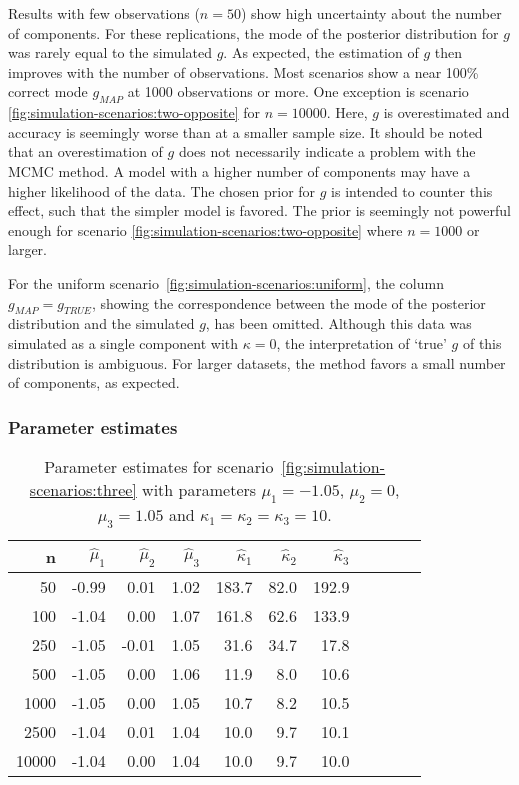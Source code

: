 Results with few observations ($n = 50$) show high uncertainty about the number of components. For these replications, the mode of the posterior distribution for $g$ was rarely equal to the simulated $g$. As expected, the estimation of $g$ then improves with the number of observations. Most scenarios show a near 100\% correct mode $g_{MAP}$ at 1000 observations or more. One exception is scenario \ref{fig:simulation-scenarios:two-opposite} for $n=10000$. Here, $g$ is overestimated and accuracy is seemingly worse than at a smaller sample size. It should be noted that an overestimation of $g$ does not necessarily indicate a problem with the MCMC method. A model with a higher number of components may have a higher likelihood of the data. The chosen prior for $g$ is intended to counter this effect, such that the simpler model is favored. The prior is seemingly not powerful enough for scenario \ref{fig:simulation-scenarios:two-opposite} where $n=1000$ or larger.


For the uniform scenario~\ref{fig:simulation-scenarios:uniform}, the column $g_{MAP} = g_{TRUE}$, showing the correspondence between the mode of the posterior distribution and the simulated $g$, has been omitted. Although this data was simulated as a single component with $\kappa = 0$, the interpretation of `true' $g$ of this distribution is ambiguous. For larger datasets, the method favors a small number of components, as expected. 

\subsubsection{Parameter estimates}

\begin{table}
	\centering
	\caption{Parameter estimates for scenario~\ref{fig:simulation-scenarios:three} with parameters $\mu_1 = -1.05$, $\mu_2 = 0$, $\mu_3 = 1.05$ and $\kappa_1 = \kappa_2 = \kappa_3 = 10$.}
	\label{table:simulation-results-2}
	\begin{tabular}{rrrrrrrrrrr}
		n & $\hat{\mu}_1$ & $\hat{\mu}_2$ & $\hat{\mu}_3$ & $\hat{\kappa}_1$ & $\hat{\kappa}_2$ & $\hat{\kappa}_3$ \\
		\hline
		50    & -0.99 & 0.01 & 1.02 & 183.7 & 82.0 & 192.9 \\
		100   & -1.04 & 0.00 & 1.07 & 161.8 & 62.6 & 133.9 \\
		250   & -1.05 & -0.01 & 1.05 & 31.6 & 34.7 & 17.8 \\
		500   & -1.05 & 0.00  & 1.06 & 11.9 & 8.0  & 10.6 \\
		1000  & -1.05 & 0.00  & 1.05 & 10.7 & 8.2  & 10.5 \\
		2500  & -1.04 & 0.01  & 1.04 & 10.0 & 9.7 & 10.1 \\
		10000 & -1.04 & 0.00  & 1.04 & 10.0 & 9.7  & 10.0 \\
		\hline
	\end{tabular}
\end{table}

